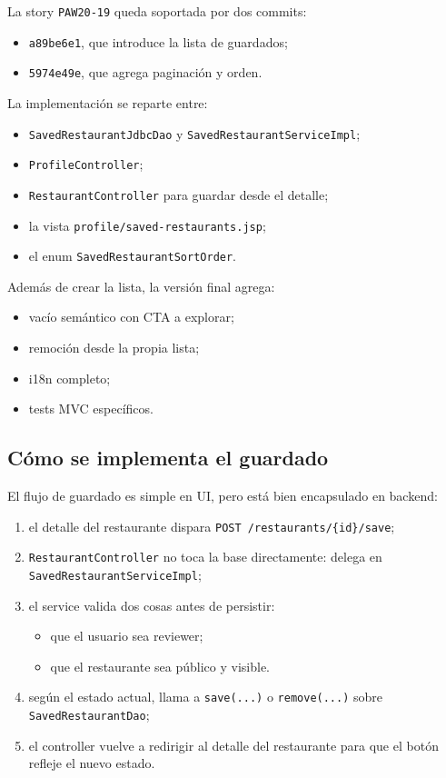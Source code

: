 \documentclass[11pt,a4paper]{report}
\newcommand{\commit}[1]{\texttt{#1}}
\newcommand{\code}[1]{\nolinkurl{#1}}
\newcommand{\story}[1]{\texttt{#1}}
\begin{document}
La story \story{PAW20-19} queda soportada por dos commits:

\begin{itemize}
  \item \commit{a89be6e1}, que introduce la lista de guardados;
  \item \commit{5974e49e}, que agrega paginaci\'on y orden.
\end{itemize}

La implementaci\'on se reparte entre:

\begin{itemize}
  \item \code{SavedRestaurantJdbcDao} y \code{SavedRestaurantServiceImpl};
  \item \code{ProfileController};
  \item \code{RestaurantController} para guardar desde el detalle;
  \item la vista \code{profile/saved-restaurants.jsp};
  \item el enum \code{SavedRestaurantSortOrder}.
\end{itemize}

Adem\'as de crear la lista, la versi\'on final agrega:

\begin{itemize}
  \item vac\'io sem\'antico con CTA a explorar;
  \item remoci\'on desde la propia lista;
  \item i18n completo;
  \item tests MVC espec\'ificos.
\end{itemize}

\subsection{C\'omo se implementa el guardado}

El flujo de guardado es simple en UI, pero est\'a bien encapsulado en backend:

\begin{enumerate}
  \item el detalle del restaurante dispara \code{POST /restaurants/\{id\}/save};
  \item \code{RestaurantController} no toca la base directamente: delega en \code{SavedRestaurantServiceImpl};
  \item el service valida dos cosas antes de persistir:
    \begin{itemize}
      \item que el usuario sea reviewer;
      \item que el restaurante sea p\'ublico y visible.
    \end{itemize}
  \item seg\'un el estado actual, llama a \code{save(...)} o \code{remove(...)} sobre \code{SavedRestaurantDao};
  \item el controller vuelve a redirigir al detalle del restaurante para que el bot\'on refleje el nuevo estado.
\end{enumerate}
\end{document}
